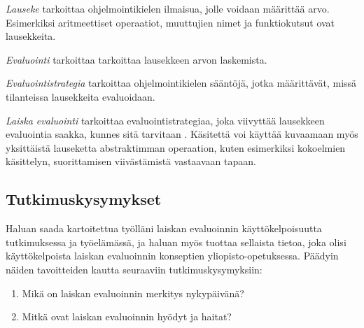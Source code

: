 \textit{Lauseke} tarkoittaa ohjelmointikielen ilmaisua, jolle voidaan määrittää arvo. Esimerkiksi aritmeettiset operaatiot, muuttujien nimet ja funktiokutsut ovat lausekkeita.

\textit{Evaluointi} tarkoittaa tarkoittaa lausekkeen arvon laskemista.

\textit{Evaluointistrategia} tarkoittaa ohjelmointikielen sääntöjä, jotka määrittävät, missä tilanteissa lausekkeita evaluoidaan.

\textit{Laiska evaluointi} tarkoittaa evaluointistrategiaa, joka viivyttää lausekkeen evaluointia saakka, kunnes sitä tarvitaan \citep{watt2004programming}. Käsitettä voi käyttää kuvaamaan myös yksittäistä lauseketta abstraktimman operaation, kuten esimerkiksi kokoelmien käsittelyn, suorittamisen viivästämistä vastaavaan tapaan.



\subsection{Tutkimuskysymykset}

Haluan saada kartoitettua työlläni laiskan evaluoinnin käyttökelpoisuutta tutkimuksessa ja työelämässä, ja haluan myös tuottaa sellaista tietoa, joka olisi käyttökelpoista laiskan evaluoinnin konseptien yliopisto-opetuksessa. Päädyin näiden tavoitteiden kautta seuraaviin tutkimuskysymyksiin:
\begin{enumerate}
  \item{Mikä on laiskan evaluoinnin merkitys nykypäivänä?}
  \item{Mitkä ovat laiskan evaluoinnin hyödyt ja haitat?}
\end{enumerate}

